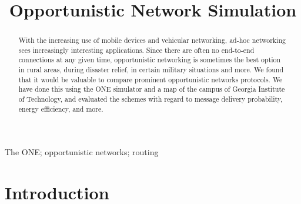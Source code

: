 \documentclass[conference]{IEEEtran}
\begin{document}
%
\title{Opportunistic Network Simulation}

\author{
}

\maketitle

\begin{abstract} %
With the increasing use of mobile devices and vehicular networking, ad-hoc networking sees increasingly interesting applications. Since there are often no end-to-end connections at any given time, opportunistic networking is sometimes the best option in rural areas, during disaster relief, in certain military situations and more. We found that it would be valuable to compare prominent opportunistic networks protocols. We have done this using the ONE simulator and a map of the campus of Georgia Institute of Technology, and evaluated the schemes with regard to message delivery probability, energy efficiency, and more.
\end{abstract}

\begin{keywords}
The ONE; opportunistic networks; routing
\end{keywords}

\IEEEpeerreviewmaketitle

\section{Introduction}
\end{document}
